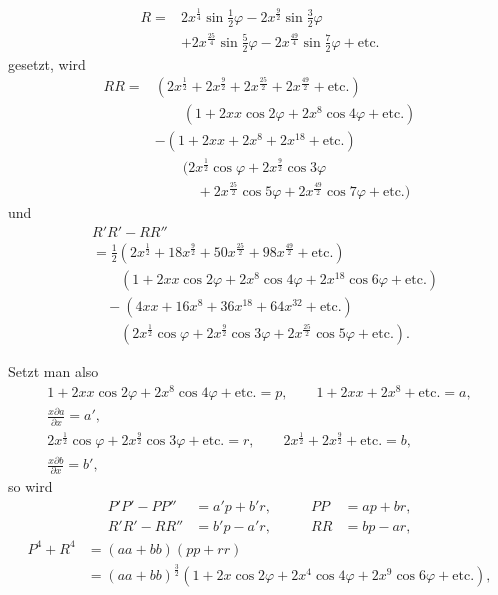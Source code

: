 \[\begin{aligned}
R={}&2x^{\frac14}\sin\tfrac12\varphi-2x^{\frac92}\sin\tfrac32\varphi\\
&+2x^{\frac{25}4}\sin\tfrac52\varphi-2x^{\frac{49}4}\sin\tfrac72\varphi+\text{etc.}
\end{aligned}\]
\noindent gesetzt, wird
\[\begin{aligned}
RR={}&(2x^{\frac12}+2x^{\frac92}+2x^{\frac{25}2}+2x^{\frac{49}2}+\text{etc.})\\
&\qquad(1+2xx\cos2\varphi+2x^8\cos4\varphi+\text{etc.})\\
&-(1+2xx+2x^8+2x^{18}+\text{etc.})\\
&\qquad(2x^{\frac12}\cos\varphi+2x^{\frac92}\cos3\varphi\\
&\qquad\quad+2x^{\frac{25}2}\cos5\varphi+2x^{\frac{49}2}\cos7\varphi+\text{etc.})
\end{aligned}\]
\noindent und
\[\begin{aligned}
&R'R'-RR''\\
&=\tfrac12(2x^{\frac12}+18x^{\frac92}+50x^{\frac{25}2}+98x^{\frac{49}2}+\text{etc.})\\
&\qquad(1+2xx\cos2\varphi+2x^8\cos4\varphi+2x^{18}\cos6\varphi+\text{etc.})\\
&\quad-(4xx+16x^8+36x^{18}+64x^{32}+\text{etc.})\\
&\qquad(2x^{\frac12}\cos\varphi+2x^{\frac92}\cos3\varphi+2x^{\frac{25}2}\cos5\varphi+\text{etc.}).
\end{aligned}\]
\par\indent Setzt man also
\[\begin{gathered}
1+2xx\cos2\varphi+2x^8\cos4\varphi+\text{etc.}=p,\qquad
1+2xx+2x^8+\text{etc.}=a,\\[5pt]
\frac{x\partial a}{\partial x}=a',\\[5pt]
2x^{\frac12}\cos\varphi+2x^{\frac92}\cos3\varphi+\text{etc.}=r,\qquad
2x^{\frac12}+2x^{\frac92}+\text{etc.}=b,\\[5pt]
\frac{x\partial b}{\partial x}=b',
\end{gathered}\]
\noindent so wird
\[\begin{aligned}
P'P'-PP''&=a'p+b'r,\qquad &PP&=ap+br,\\
R'R'-RR''&=b'p-a'r, &RR&=bp-ar,
\end{aligned}\]
\[\begin{aligned}
P^4+R^4&=(aa+bb)(pp+rr)\\
&=(aa+bb)^{\frac32}(1+2x\cos2\varphi+2x^4\cos4\varphi+2x^9\cos6\varphi+\text{etc.}),
\end{aligned}\]
